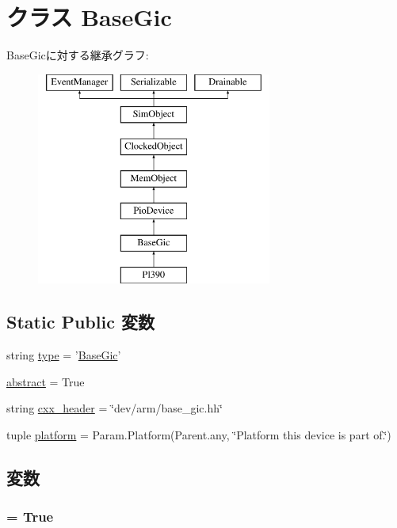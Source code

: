\hypertarget{classGic_1_1BaseGic}{
\section{クラス BaseGic}
\label{classGic_1_1BaseGic}
}
BaseGicに対する継承グラフ:\begin{figure}[H]
\begin{center}
\leavevmode
\includegraphics[height=7cm]{classGic_1_1BaseGic}
\end{center}
\end{figure}
\subsection*{Static Public 変数}
\begin{DoxyCompactItemize}
\item 
string \hyperlink{classGic_1_1BaseGic_acce15679d830831b0bbe8ebc2a60b2ca}{type} = '\hyperlink{classGic_1_1BaseGic}{BaseGic}'
\item 
\hyperlink{classGic_1_1BaseGic_a17fa61ac3806b481cafee5593b55e5d0}{abstract} = True
\item 
string \hyperlink{classGic_1_1BaseGic_a17da7064bc5c518791f0c891eff05fda}{cxx\_\-header} = \char`\"{}dev/arm/base\_\-gic.hh\char`\"{}
\item 
tuple \hyperlink{classGic_1_1BaseGic_ae6d09ca44893db6cdb66d62deaa1aefd}{platform} = Param.Platform(Parent.any, \char`\"{}Platform this device is part of.\char`\"{})
\end{DoxyCompactItemize}


\subsection{変数}
\hypertarget{classGic_1_1BaseGic_a17fa61ac3806b481cafee5593b55e5d0}{
\subsubsection[{abstract}]{ = True}}
\label{classGic_1_1BaseGic_a17fa61ac3806b481cafee5593b55e5d0}


